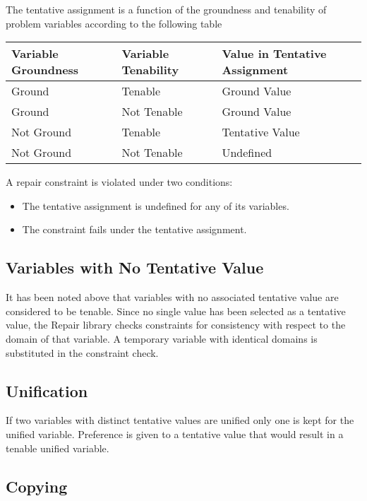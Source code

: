 The tentative assignment is a function of the groundness and tenability of
problem variables according to the following table
\vspace{0.2cm}
\noindent
\begin{center}
\begin{tabular}{||l|l|l||} \hline \hline
\label{table}
Variable Groundness & Variable Tenability & Value in Tentative Assignment \\ \hline
Ground  &   Tenable    &   Ground Value  \\
Ground   &  Not Tenable &  Ground Value  \\
Not Ground & Tenable     &  Tentative Value  \\
Not Ground & Not Tenable &  Undefined  \\

\hline \hline
\end{tabular}
\end{center}
\vspace{0.5cm}
A repair constraint is violated under two conditions:
\begin{itemize}
\item The tentative assignment is undefined for any of its variables.
\item The constraint fails under the tentative assignment.
\end{itemize}


\subsection{Variables with No Tentative Value}
It has been noted above that variables with no associated tentative value
are considered to be 
tenable.  Since no single value has been selected as a tentative value,
the Repair library checks constraints for consistency with respect to the domain of 
that variable.  A temporary variable with identical domains is substituted
in the constraint check.  

\subsection{Unification}

If two variables with distinct tentative values are unified only one
 is kept for the unified variable.  Preference is given to a tentative
value that would result in a tenable unified variable.

\subsection{Copying}

